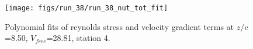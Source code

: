 \begin{figure}[H]
\centering
\texttt{[image: figs/run\_38/run\_38\_nut\_tot\_fit]}
\caption{Polynomial fits of reynolds stress and velocity gradient terms at $z/c$=8.50, $V_{free}$=28.81, station 4.}
\label{fig:run_38_nut_tot_fit}
\end{figure}


